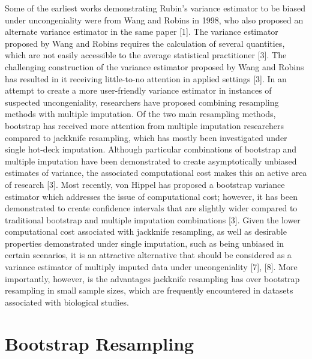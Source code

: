 \documentclass[
  letterpaper,
  DIV=11,
  numbers=noendperiod]{scrreprt}
\begin{document}
Some of the earliest works demonstrating Rubin's variance estimator to
be biased under uncongeniality were from Wang and Robins in 1998, who
also proposed an alternate variance estimator in the same paper {[}1{]}.
The variance estimator proposed by Wang and Robins requires the
calculation of several quantities, which are not easily accessible to
the average statistical practitioner {[}3{]}. The challenging
construction of the variance estimator proposed by Wang and Robins has
resulted in it receiving little-to-no attention in applied settings
{[}3{]}. In an attempt to create a more user-friendly variance estimator
in instances of suspected uncongeniality, researchers have proposed
combining resampling methods with multiple imputation. Of the two main
resampling methods, bootstrap has received more attention from multiple
imputation researchers compared to jackknife resampling, which has
mostly been investigated under single hot-deck imputation. Although
particular combinations of bootstrap and multiple imputation have been
demonstrated to create asymptotically unbiased estimates of variance,
the associated computational cost makes this an active area of research
{[}3{]}. Most recently, von Hippel has proposed a bootstrap variance
estimator which addresses the issue of computational cost; however, it
has been demonstrated to create confidence intervals that are slightly
wider compared to traditional bootstrap and multiple imputation
combinations {[}3{]}. Given the lower computational cost associated with
jackknife resampling, as well as desirable properties demonstrated under
single imputation, such as being unbiased in certain scenarios, it is an
attractive alternative that should be considered as a variance estimator
of multiply imputed data under uncongeniality {[}7{]}, {[}8{]}. More
importantly, however, is the advantages jackknife resampling has over
bootstrap resampling in small sample sizes, which are frequently
encountered in datasets associated with biological studies.

\hypertarget{bootstrap-resampling}{%
\section{Bootstrap Resampling}\label{bootstrap-resampling}}
\end{document}
